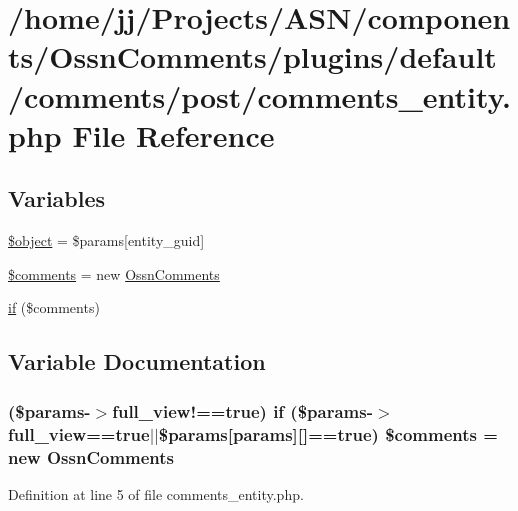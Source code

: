 \hypertarget{comments__entity_8php}{}\section{/home/jj/\+Projects/\+A\+S\+N/components/\+Ossn\+Comments/plugins/default/comments/post/comments\+\_\+entity.php File Reference}
\label{comments__entity_8php}
\subsection*{Variables}
\begin{DoxyCompactItemize}
\item 
\hyperlink{comments__entity_8php_a52123b83a1952a68c5513e47d59ec4a6}{\$object} = \$params\mbox{[}\textquotesingle{}entity\+\_\+guid\textquotesingle{}\mbox{]}
\item 
\hyperlink{comments__entity_8php_a0eb2cfd8550d450e28b1c735fc477209}{\$comments} = new \hyperlink{class_ossn_comments}{Ossn\+Comments}
\item 
\hyperlink{comments__entity_8php_aaad1116b99ed75ccefcdb57f6ed3fb43}{if} (\$comments)
\end{DoxyCompactItemize}


\subsection{Variable Documentation}
\subsubsection[{\texorpdfstring{\$comments}{$comments}}]{ (\$params-\/$>$full\+\_\+view!==true) {\bf if} (\$params-\/$>${\bf full\+\_\+view}==true$\vert$$\vert$\$params\mbox{[}\textquotesingle{}params\textquotesingle{}\mbox{]}\mbox{[}\textquotesingle{}\mbox{]}==true) \$comments = new {\bf Ossn\+Comments}}\hypertarget{comments__entity_8php_a0eb2cfd8550d450e28b1c735fc477209}{}\label{comments__entity_8php_a0eb2cfd8550d450e28b1c735fc477209}


Definition at line 5 of file comments\+\_\+entity.\+php.

